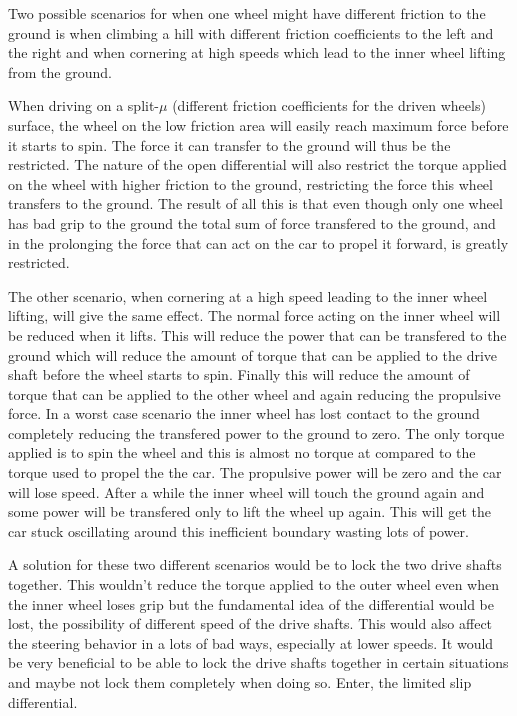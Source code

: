 Two possible scenarios for when one wheel might have different friction to the ground is when climbing a hill with different friction coefficients to the left and the right and when cornering at high speeds which lead to the inner wheel lifting from the ground. 

When driving on a split-$ \mu $ (different friction coefficients for the driven wheels) surface, the wheel on the low friction area will easily reach maximum force before it starts to spin. The force it can transfer to the ground will thus be the restricted. The nature of the open differential will also restrict the torque applied on the wheel with higher friction to the ground, restricting the force this wheel transfers to the ground. The result of all this is that even though only one wheel has bad grip to the ground the total sum of force transfered to the ground, and in the prolonging the force that can act on the car to propel it forward, is greatly restricted.

The other scenario, when cornering at a high speed leading to the inner wheel lifting, will give the same effect. The normal force acting on the inner wheel will be reduced when it lifts. This will reduce the power that can be transfered to the ground which will reduce the amount of torque that can be applied to the drive shaft before the wheel starts to spin. Finally this will reduce the amount of torque that can be applied to the other wheel and again reducing the propulsive force. In a worst case scenario the inner wheel has lost contact to the ground completely reducing the transfered power to the ground to zero. The only torque applied is to spin the wheel and this is almost no torque at compared to the torque used to propel the the car. The propulsive power will be zero and the car will lose speed. After a while the inner wheel will touch the ground again and some power will be transfered only to lift the wheel up again. This will get the car stuck oscillating around this inefficient boundary wasting lots of power.

A solution for these two different scenarios would be to lock the two drive shafts together. This wouldn't reduce the torque applied to the outer wheel even when the inner wheel loses grip but the fundamental idea of the differential would be lost, the possibility of different speed of the drive shafts. This would also affect the steering behavior in a lots of bad ways, especially at lower speeds. It would be very beneficial to be able to lock the drive shafts together in certain situations and maybe not lock them completely when doing so. Enter, the limited slip differential.

